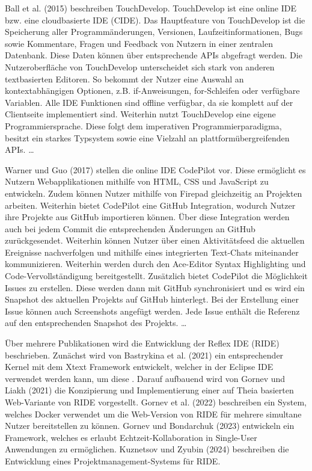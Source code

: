 Ball et al. (2015) \cite{ball_beyond_2015} beschreiben TouchDevelop. TouchDevelop ist eine online IDE bzw. eine cloudbasierte IDE (CIDE). Das Hauptfeature von TouchDevelop ist die Speicherung aller Programmänderungen, Versionen, Laufzeitinformationen, Bugs sowie Kommentare, Fragen und Feedback von Nutzern in einer zentralen Datenbank. Diese Daten können über entsprechende APIs abgefragt werden. Die Nutzeroberfläche von TouchDevelop unterscheidet sich stark von anderen textbasierten Editoren. So bekommt der Nutzer eine Auswahl an kontextabhängigen Optionen, z.B. if-Anweisungen, for-Schleifen oder verfügbare Variablen. Alle IDE Funktionen sind offline verfügbar, da sie komplett auf der Clientseite implementiert sind. Weiterhin nutzt TouchDevelop eine eigene Programmiersprache. Diese folgt dem imperativen Programmierparadigma, besitzt ein starkes Typsystem sowie eine Vielzahl an plattformübergreifenden APIs. \dots {}

Warner und Guo (2017) \cite{warner_codepilot_2017} stellen die online IDE CodePilot vor. Diese ermöglicht es Nutzern Webapplikationen mithilfe von HTML, CSS und JavaScript zu entwickeln. Zudem können Nutzer mithilfe von Firepad  gleichzeitig an Projekten arbeiten. Weiterhin bietet CodePilot eine GitHub  Integration, wodurch Nutzer ihre Projekte aus GitHub importieren können. Über diese Integration werden auch bei jedem Commit die entsprechenden Änderungen an GitHub zurückgesendet. Weiterhin können Nutzer über einen Aktivitätsfeed die aktuellen Ereignisse nachverfolgen und mithilfe eines integrierten Text-Chats miteinander kommunizieren. Weiterhin werden durch den Ace-Editor \cite{noauthor_ace_nodate} Syntax Highlighting und Code-Vervollständigung bereitgestellt. Zusätzlich bietet CodePilot die Möglichkeit Issues zu erstellen. Diese werden dann mit GitHub synchronisiert und es wird ein Snapshot des aktuellen Projekts auf GitHub hinterlegt. Bei der Erstellung einer Issue können auch Screenshots angefügt werden. Jede Issue enthält die Referenz auf den entsprechenden Snapshot des Projekts. \dots {}

Über mehrere Publikationen wird die Entwicklung der Reflex IDE (RIDE) beschrieben.  Zunächst wird von Bastrykina et al. (2021) \cite{bastrykina_developing_2021} ein entsprechender Kernel mit dem Xtext Framework \cite{noauthor_xtext_nodate} entwickelt, welcher in der Eclipse IDE verwendet werden kann, um diese \todo{}. Darauf aufbauend wird von Gornev und Liakh (2021) \cite{gornev_ride_2021} die Konzipierung und Implementierung einer auf Theia basierten Web-Variante von RIDE vorgestellt. Gornev et al. (2022) \cite{gornev_towards_2022} beschreiben ein System, welches Docker verwendet um die Web-Version von RIDE für mehrere simultane Nutzer bereitstellen zu können. Gornev und Bondarchuk (2023) \cite{gornev_towards_2023} entwickeln ein Framework, welches es erlaubt Echtzeit-Kollaboration in Single-User Anwendungen zu ermöglichen. Kuznetsov und Zyubin (2024) \cite{kuznetsov_development_2024} beschreiben die Entwicklung eines Projektmanagement-Systems für RIDE. 

